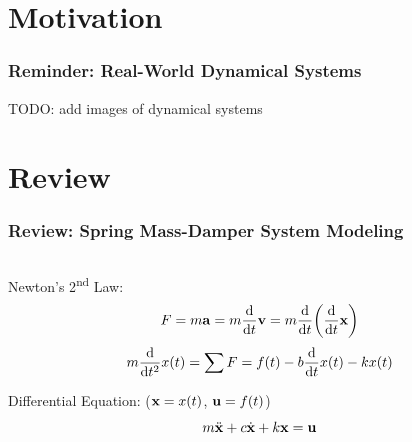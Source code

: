 \documentclass[aspectratio=169]{beamer}
\begin{document}
\section{Motivation}
\begin{frame}
	\frametitle{Reminder: Real-World Dynamical Systems}
	
	TODO: add images of dynamical systems

\end{frame}


\section{Review}
\begin{frame}
	\frametitle{Review: Spring Mass-Damper System Modeling}
	\begin{columns}
		\begin{column}{0.5 \textwidth}
			\pause
			Newton's 2\textsuperscript{nd} Law:
			\[
				F = m \vb{a} 
				= m \dv{t} \vb{v} 
				= m \dv{t} \qty(\dv{t} \vb{x})
			\]
			\pause
			\[
				m \dv{t^2} x(t) 
				= \sum F 
				= f(t) - b \dv{t} x(t) - k x(t)
			\] 
			\vspace{1em}

			\pause{}
			Differential Equation: ($\vb{x} = x(t)$, $\vb{u} = f(t)$)
			\[
				m \ddot{\vb{x}} + c \dot{\vb{x}} + k \vb{x} = \vb{u}
			\]
			

\end{column}
\end{columns}
\end{frame}
\end{document}
